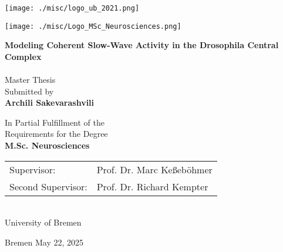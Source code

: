 \documentclass[../main.tex]{subfiles}
\begin{document}
\thispagestyle{empty}

\begin{center}
    \vspace*{0.5cm}
    \noindent
    \begin{minipage}[t]{0.49\textwidth}
        \texttt{[image: ./misc/logo\_ub\_2021.png]}
    \end{minipage}%
    \hfill
    \begin{minipage}[t]{0.49\textwidth}
        \raggedleft
        \texttt{[image: ./misc/Logo\_MSc\_Neurosciences.png]}
    \end{minipage}
    
    \vspace*{1.3cm}
        
    \textbf{\huge Modeling Coherent Slow-Wave Activity in the Drosophila Central Complex \\\phantom{}}\\[5 mm]

        {\huge Master Thesis}\\[3 mm]

        {\large Submitted by}\\[2 mm]

        {\large \textbf{Archili Sakevarashvili}\\[1.5 cm]}

        
    
    {\large In Partial Fulfillment of the \\Requirements for the Degree \\[1 mm]
        \textbf{M.Sc. Neurosciences}}\\[2 cm]
    
    \begin{tabular}{l l}
        {\large Supervisor:} & {\large Prof. Dr. Marc Keßeböhmer} \\
            {\large Second Supervisor:} & {\large Prof. Dr. Richard Kempter}
    \end{tabular}\\[1.5 cm]

    {\Large University of Bremen}

    {\large Bremen May 22, 2025}	
\end{center}
\end{document}
